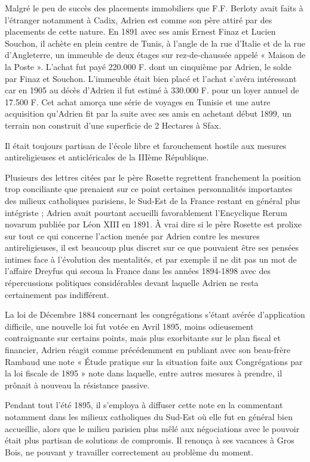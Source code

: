 \documentclass[11pt,a4paper]{report}
\begin{document}

Malgré le peu de succès des placements immobiliers que F.F. Berloty avait faits à l'étranger notamment à Cadix, Adrien est comme son père attiré par des placements de cette nature. En 1891 avec ses amis Ernest Finaz et Lucien Souchon, il achète en plein centre de Tunis, à l'angle de la rue d'Italie et de la rue d'Angleterre, un immeuble de deux étages sur rez-de-chaussée appelé « Maison de la Poste ». L'achat fut payé 220.000 F. dont un cinquième par Adrien, le solde par Finaz et Souchon. L'immeuble était bien placé et l'achat s'avéra intéressant car en 1905 au décès d'Adrien il fut estimé à 330.000 F. pour un loyer annuel de 17.500 F. Cet achat amorça une série de voyages en Tunisie et une autre acquisition qu'Adrien fit par la suite avec ses amis en achetant début 1899, un terrain non construit d'une superficie de 2 Hectares à Sfax.

Il était toujours partisan de l'école libre et farouchement hostile aux mesures antireligieuses et anticléricales de la IIIème République.

Plusieurs des lettres citées par le père Rosette regrettent franchement la position trop conciliante que prenaient sur ce point certaines personnalités importantes des milieux catholiques parisiens, le Sud-Est de la France restant en général plus intégriste ; Adrien avait pourtant accueilli favorablement l'Encyclique Rerum novarum publiée par Léon XIII en 1891. À vrai dire si le père Rosette est prolixe sur tout ce qui concerne l'action menée par Adrien contre les mesures antireligieuses, il est beaucoup plus discret sur ce que pouvaient être ses pensées intimes face à l'évolution des mentalités, et par exemple il ne dit pas un mot de l'affaire Dreyfus qui secoua la France dans les années 1894-1898 avec des répercussions politiques considérables devant laquelle Adrien ne resta certainement pas indifférent.

La loi de Décembre 1884 concernant les congrégations s'étant avérée d'application difficile, une nouvelle loi fut votée en Avril 1895, moins odieusement contraignante sur certains points, mais plus exorbitante sur le plan fiscal et financier, Adrien réagit comme précédemment en publiant avec son beau-frère Rambaud une note « Étude pratique sur la situation faite aux Congrégations par la loi fiscale de 1895 » note dans laquelle, entre autres mesures à prendre, il prônait à nouveau la résistance passive.

Pendant tout l'été 1895, il s'employa à diffuser cette note en la commentant notamment dans les milieux catholiques du Sud-Est où elle fut en général bien accueillie, alors que le milieu parisien plus mêlé aux négociations avec le pouvoir était plus partisan de solutions de compromis. Il renonça à ses vacances à Gros Bois, ne pouvant y travailler correctement au problème du moment.
\end{document}
